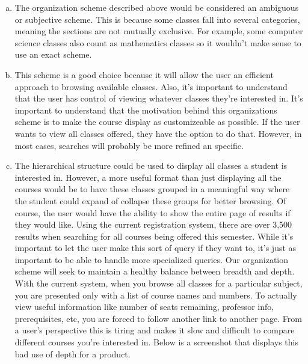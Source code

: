 \documentclass[11pt]{article}
\begin{document}
\begin{enumerate}[1.]
\begin{enumerate}[a)]
\item The organization scheme described above would be considered an ambiguous or subjective scheme.  This is because some classes fall into several categories, meaning the sections are not mutually exclusive.  For example, some computer science classes also count as mathematics classes so it wouldn't make sense to use an exact scheme.  
\item This scheme is a good choice because it will allow the user an efficient approach to browsing available classes.  Also, it's important to understand that the user has control of viewing whatever classes they're interested in.  It's important to understand that the motivation behind this organizations scheme is to make the course display as customizeable as possible.  If the user wants to view all classes offered, they have the option to do that.  However, in most cases, searches will probably be more refined an specific.  
\item The hierarchical structure could be used to display all classes a student is interested in.  However, a more useful format than just displaying all the courses would be to have these classes grouped in a meaningful way where the student could expand of collapse these groups for better browsing.  Of course, the user would have the ability to show the entire page of results if they would like.  Using the current registration system, there are over 3,500 results when searching for all courses being offered this semester.  While it's important to let the user make this sort of query if they want to, it's just as important to be able to handle more specialized queries.  Our organization scheme will seek to maintain a healthy balance between breadth and depth.  With the current system, when you browse all classes for a particular subject, you are presented only with a list of course names and numbers.  To actually view useful information like number of seats remaining, professor info, prerequisites, etc, you are forced to follow another link to another page.  From a user's perspective this is tiring and makes it slow and difficult to compare different courses you're interested in.  Below is a screenshot that displays this bad use of depth for a product.  


\end{enumerate}
\end{enumerate}
\end{document}
